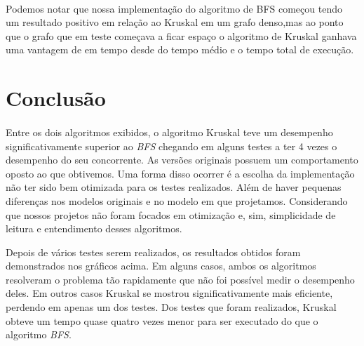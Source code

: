 \documentclass[12pt]{article}
\begin{document}
  \paragraph{}Podemos notar que nossa implementação do algoritmo de BFS começou tendo
   um resultado positivo em relação ao Kruskal em um grafo denso,mas ao ponto que o grafo
    que em teste começava a ficar espaço o algoritmo de Kruskal ganhava uma vantagem de em
     tempo desde do tempo médio e o tempo total de execução.
     
     

  \section{Conclusão}

  \paragraph{} Entre os dois algoritmos exibidos, o algoritmo Kruskal teve um desempenho significativamente superior ao \emph{BFS} chegando em alguns testes a ter 4 vezes o desempenho do seu concorrente. As versões originais possuem um comportamento oposto ao que obtivemos. Uma forma disso ocorrer é a escolha da implementação não ter sido bem otimizada para os testes realizados. Além de haver pequenas diferenças nos modelos originais e no modelo em que projetamos. Considerando que nossos projetos não foram focados em otimização e, sim, simplicidade de leitura e entendimento desses algoritmos. 

Depois de vários testes serem realizados, os resultados obtidos foram demonstrados nos gráficos acima. Em alguns casos, ambos os algoritmos resolveram o problema tão rapidamente que não foi possível medir o desempenho deles. Em outros casos Kruskal se mostrou significativamente mais eficiente, perdendo em apenas um dos testes. Dos testes que foram realizados, Kruskal obteve um tempo quase quatro vezes menor para ser executado do que o algoritmo \emph{BFS}.
\end{document}
